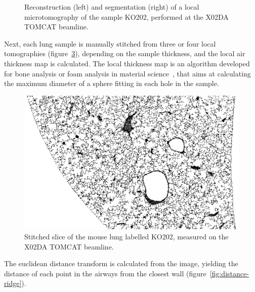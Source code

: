 \begin{figure}[htb]
\begin{subfigure}[b]{.49\textwidth}
    \caption{}
    \label{fig:segmented}
    \end{subfigure}
    \caption[Reconstruction of a lung microtomography.]{Reconstruction
        (left) and
        segmentation (right) of a local microtomography of the sample KO202,
        performed at the X02DA TOMCAT beamline.}
\end{figure}

Next, each lung sample is manually stitched from three or four local
tomographies (figure~\ref{fig:stitched}), depending on the sample thickness, and the local air thickness
map is calculated. The local thickness map is an algorithm developed for
bone analysis or foam analysis in material science~\parencite{localthickness}, that aims
at calculating the maximum diameter of a sphere fitting in each hole in the
sample.
\begin{figure}[htb]
    \centering
    \includegraphics[width=\textwidth]{gfx/lung-paper-figures/0700.png}
    \caption[Stitched beamline tomography of a mouse lung.]{Stitched slice of the mouse lung labelled KO202, measured on
    the X02DA TOMCAT beamline.}
    \label{fig:stitched}
\end{figure}
The euclidean distance transform is calculated from the image, yielding the
distance of each point in the airways from the closest
wall (figure~\ref{fig:distance-ridge}).
